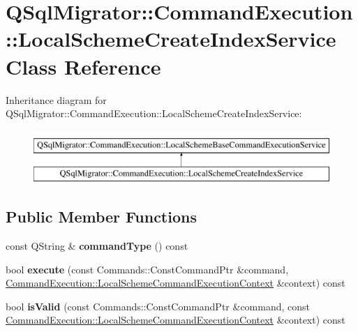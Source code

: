 \hypertarget{class_q_sql_migrator_1_1_command_execution_1_1_local_scheme_create_index_service}{}\section{Q\+Sql\+Migrator\+:\+:Command\+Execution\+:\+:Local\+Scheme\+Create\+Index\+Service Class Reference}
\label{class_q_sql_migrator_1_1_command_execution_1_1_local_scheme_create_index_service}
Inheritance diagram for Q\+Sql\+Migrator\+:\+:Command\+Execution\+:\+:Local\+Scheme\+Create\+Index\+Service\+:\begin{figure}[H]
\begin{center}
\leavevmode
\includegraphics[height=2.000000cm]{class_q_sql_migrator_1_1_command_execution_1_1_local_scheme_create_index_service}
\end{center}
\end{figure}
\subsection*{Public Member Functions}
\begin{DoxyCompactItemize}
\item 
\mbox{\label{class_q_sql_migrator_1_1_command_execution_1_1_local_scheme_create_index_service_a8f229a82d5a9a26a6944c1ad91e11314}} 
const Q\+String \& {\bfseries command\+Type} () const
\item 
\mbox{\label{class_q_sql_migrator_1_1_command_execution_1_1_local_scheme_create_index_service_af4e789d3a24af24c806aa8f4b107e8bc}} 
bool {\bfseries execute} (const Commands\+::\+Const\+Command\+Ptr \&command, \hyperlink{class_q_sql_migrator_1_1_command_execution_1_1_local_scheme_command_execution_context}{Command\+Execution\+::\+Local\+Scheme\+Command\+Execution\+Context} \&context) const
\item 
\mbox{\label{class_q_sql_migrator_1_1_command_execution_1_1_local_scheme_create_index_service_a3a787f92abfe9cf41714539146875b07}} 
bool {\bfseries is\+Valid} (const Commands\+::\+Const\+Command\+Ptr \&command, const \hyperlink{class_q_sql_migrator_1_1_command_execution_1_1_local_scheme_command_execution_context}{Command\+Execution\+::\+Local\+Scheme\+Command\+Execution\+Context} \&context) const
\end{DoxyCompactItemize}


